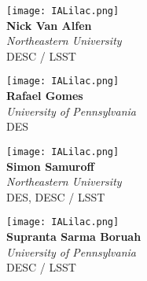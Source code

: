\documentclass[10pt,letterpaper]{article}
\begin{document}
\newpage
\begin{multicols}{2}

    \begin{minipage}[t][2in][c]{.45\textwidth}
    \centering
    \texttt{[image: IALilac.png]}\\
    \Huge \textbf{Nick Van Alfen}\\
    \vspace{0.3cm}
    \Large \textit{Northeastern University} \\
    \vspace{0.5cm}
    \small DESC / LSST
    \end{minipage}
    \vspace{.5cm}
    
    \begin{minipage}[t][2in][c]{.45\textwidth}
    \centering
    \texttt{[image: IALilac.png]}\\
    \Huge \textbf{Rafael Gomes}\\
    \vspace{0.3cm}
    \Large \textit{University of Pennsylvania} \\
    \vspace{0.5cm}
    \small DES
    \end{minipage}
    \vspace{.5cm}
    
    \begin{minipage}[t][2in][c]{.45\textwidth}
    \centering
    \texttt{[image: IALilac.png]}\\
    \Huge \textbf{Simon Samuroff}\\
    \vspace{0.3cm}
    \Large \textit{Northeastern University} \\
    \vspace{0.5cm}
    \small DES, DESC / LSST
    \end{minipage}
    \vspace{.5cm}
    
    \begin{minipage}[t][2in][c]{.45\textwidth}
    \centering
    \texttt{[image: IALilac.png]}\\
    \huge \textbf{Supranta Sarma Boruah}\\
    \vspace{0.3cm}
    \Large \textit{University of Pennsylvania} \\
    \vspace{0.5cm}
    \small DESC / LSST
    \end{minipage}
    \vspace{.5cm}
    

\end{multicols}
\end{document}
